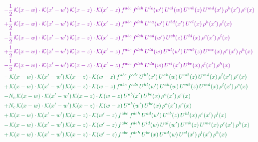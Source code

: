 \documentclass[10pt]{article}
\numberwithin{equation}{section}
\begin{document}
\begin{align}
&{\color{CC} -\frac{1}{2}\,\mathcal{K}(x-w)\cdot\mathcal{K}(x'-w')\,\mathcal{K}(x-z)\cdot\mathcal{K}(x'-z)\,f^{abc}\,f^{deh}\,U^{le}(w')\,U^{al}(w)\,U^{mb}(z)\,U^{md}(x')\,\rho^{h}(x')\,\rho^{c}(x)} \notag\\
&{\color{CC} +\frac{1}{2}\,\mathcal{K}(x-w)\cdot\mathcal{K}(x'-w')\,\mathcal{K}(x-z)\cdot\mathcal{K}(x'-z)\,f^{abc}\,f^{deh}\,U^{ea}(w')\,U^{bd}(x')\,U^{cl}(x)\,\rho^{h}(x')\,\rho^{l}(x)} \notag\\
&{\color{CC} -\frac{1}{2}\,\mathcal{K}(x-w)\cdot\mathcal{K}(x'-w')\,\mathcal{K}(x-z)\cdot\mathcal{K}(x'-z)\,f^{abc}\,f^{deh}\,U^{ad}(w')\,U^{eb}(z)\,U^{hl}(x)\,\rho^{c}(x')\,\rho^{l}(x)} \notag\\
&{\color{CC} +\frac{1}{2}\,\mathcal{K}(x-w)\cdot\mathcal{K}(x'-w')\,\mathcal{K}(x-z)\cdot\mathcal{K}(x'-z)\,f^{abc}\,f^{deh}\,U^{ld}(w)\,U^{al}(w')\,U^{mb}(z)\,U^{me}(x)\,\rho^{c}(x')\,\rho^{h}(x)} \notag\\
&{\color{CC} -\frac{1}{2}\,\mathcal{K}(x-w)\cdot\mathcal{K}(x'-w')\,\mathcal{K}(x-z)\cdot\mathcal{K}(x'-z)\,f^{abc}\,f^{deh}\,U^{da}(w)\,U^{cl}(x')\,U^{be}(x)\,\rho^{l}(x')\,\rho^{h}(x)} \notag\\
&{\color{JIM} -\,\mathcal{K}(x-w)\cdot\mathcal{K}(x'-w')\,\mathcal{K}(x-z)\cdot\mathcal{K}(w-z)\,f^{abc}\,f^{cde}\,U^{hl}(x')\,U^{ah}(w)\,U^{mb}(z)\,U^{md}(x)\,\rho^{l}(x')\,\rho^{e}(x)} \notag\\
&{\color{JIM} +\,\mathcal{K}(x-w)\cdot\mathcal{K}(x'-w')\,\mathcal{K}(x-z)\cdot\mathcal{K}(w-z)\,f^{abc}\,f^{cde}\,U^{hl}(w')\,U^{ah}(w)\,U^{mb}(z)\,U^{md}(x)\,\rho^{l}(x')\,\rho^{e}(x)} \notag\\
&{\color{JIM} -N_{c}\,\mathcal{K}(x-w)\cdot\mathcal{K}(x'-w')\,\mathcal{K}(x-z)\cdot\mathcal{K}(w-z)\,U^{ab}(x')\,U^{bc}(x)\,\rho^{a}(x')\,\rho^{c}(x)} \notag\\
&{\color{JIM} +N_{c}\,\mathcal{K}(x-w)\cdot\mathcal{K}(x'-w')\,\mathcal{K}(x-z)\cdot\mathcal{K}(w-z)\,U^{ab}(w')\,U^{bc}(x)\,\rho^{a}(x')\,\rho^{c}(x)} \notag\\
&{\color{JIM} +\,\mathcal{K}(x-w)\cdot\mathcal{K}(x'-w')\,\mathcal{K}(x-z)\cdot\mathcal{K}(w'-z)\,f^{abc}\,f^{deh}\,U^{ad}(w')\,U^{eb}(z)\,U^{hl}(x)\,\rho^{c}(x')\,\rho^{l}(x)} \notag\\
&{\color{JIM} -\,\mathcal{K}(x-w)\cdot\mathcal{K}(x'-w')\,\mathcal{K}(x-z)\cdot\mathcal{K}(w'-z)\,f^{abc}\,f^{deh}\,U^{ld}(w)\,U^{al}(w')\,U^{mb}(z)\,U^{me}(x)\,\rho^{c}(x')\,\rho^{h}(x)} \notag\\
&{\color{JIM} +\,\mathcal{K}(x-w)\cdot\mathcal{K}(x'-w')\,\mathcal{K}(x-z)\cdot\mathcal{K}(w'-z)\,f^{abc}\,f^{deh}\,U^{be}(x)\,U^{ad}(w)\,U^{cl}(x')\,\rho^{l}(x')\,\rho^{h}(x)} \notag\\

\end{align}
\end{document}
